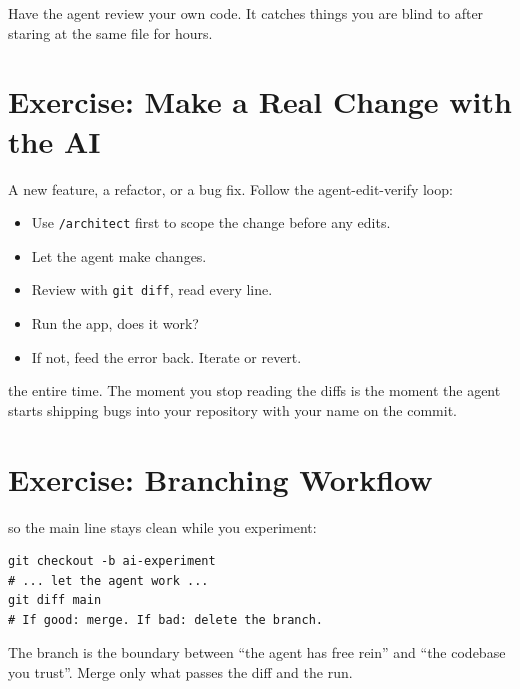  Have the agent review your own code. It catches things you are
blind to after staring at the same file for hours.

\newpage
\section{Exercise: Make a Real Change with the AI}

 A new feature, a refactor, or a bug fix. Follow the
agent-edit-verify loop:

\begin{itemize}
    \item Use \texttt{/architect} first to scope the change before any edits.
    \item Let the agent make changes.
    \item Review with \texttt{git diff}, read every line.
    \item Run the app, does it work?
    \item If not, feed the error back. Iterate or revert.
\end{itemize}

 the entire time. The moment you stop reading the diffs is the moment
the agent starts shipping bugs into your repository with your name on the commit.

\newpage
\section{Exercise: Branching Workflow}

 so the main line stays clean while you experiment:

\begin{verbatim}
git checkout -b ai-experiment
# ... let the agent work ...
git diff main
# If good: merge. If bad: delete the branch.
\end{verbatim}

The branch is the boundary between ``the agent has free rein'' and ``the codebase you trust''.
Merge only what passes the diff and the run.

\newpage
